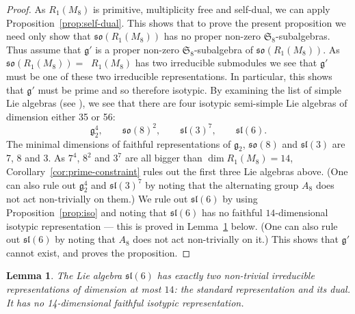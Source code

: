 \documentclass{amsart}
\newtheorem{lemma}[theorem]{Lemma}
\theoremstyle{definition}
\theoremstyle{remark}
\DeclareMathOperator{\bw}{{\bigwedge}^{\! 2}}
\def\SS{\mathfrak{S}}
\let\mf\mathfrak
\begin{document}
\begin{proof}
As $R_1(M_8)$ is primitive, multiplicity free and self-dual, we can apply Proposition~\ref{prop:self-dual}.  This shows
that to prove the present proposition we need only show that $\mf{so}(R_1(M_8))$ has no proper non-zero
$\SS_8$-subalgebras.  Thus assume that $\mf{g}'$ is a proper non-zero $\SS_8$-subalgebra of $\mf{so}(R_1(M_8))$.  As
$\mf{so}(R_1(M_8))=\bw{R_1(M_8)}$ has two irreducible submodules we see that $\mf{g}'$ must be one of these two
irreducible representations.  In particular, this shows that $\mf{g}'$ must be prime and so therefore isotypic.  By examining the list
of simple Lie algebras (see \cite[\S 9.4]{FH}), we see that there are four isotypic semi-simple Lie algebras of
dimension either 35 or 56:
\begin{displaymath}
\mf{g}_2^4, \qquad \mf{so}(8)^2, \qquad \mf{sl}(3)^7, \qquad \mf{sl}(6).
\end{displaymath}
The minimal dimensions of faithful representations of $\mf{g}_2$, $\mf{so}(8)$ and $\mf{sl}(3)$ are 7, 8 and 3.  As
$7^4$, $8^2$ and $3^7$ are all bigger than $\dim{R_1(M_8)}=14$, Corollary~\ref{cor:prime-constraint} rules out the first
three Lie algebras above.  (One can also rule out $\mf{g}_2^4$ and $\mf{sl}(3)^7$ by noting that the alternating group
$A_8$ does not act non-trivially on them.) We rule out $\mf{sl}(6)$ by using Proposition~\ref{prop:iso} and noting that
$\mf{sl}(6)$ has no faithful $14$-dimensional isotypic representation --- this is proved in Lemma~\ref{lem:sl6} below.
(One can also rule out $\mf{sl}(6)$ by noting that $A_8$ does not act non-trivially on it.)  This shows that $\mf{g}'$
cannot exist, and proves the proposition.
\end{proof}

\begin{lemma}
\label{lem:sl6}
The Lie algebra $\mf{sl}(6)$ has exactly two non-trivial irreducible representations of dimension at most $14$:  the
standard representation and its dual.  It has no 14-dimensional faithful isotypic representation.
\end{lemma}
\end{document}
